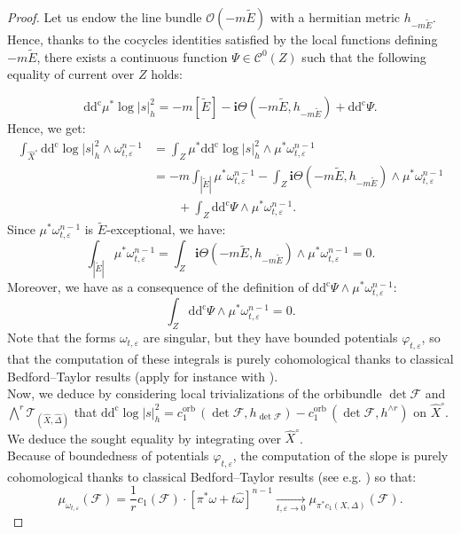 \documentclass[12pt,a4paper]{amsart}
\newcommand{\orb}{\mathrm{orb}\,}
\newcommand{\ddc}{\mathrm{dd^c}}
\theoremstyle{plain}
\theoremstyle{definition}
\begin{document}
\begin{proof}
	 Let us endow the line bundle $\mathcal{O}(-m \widetilde{E})$ with a hermitian metric $h_{-m \widetilde{E}}$. Hence, thanks to the cocycles identities satisfied by the local functions defining $-m \widetilde{E}$, there exists a continuous function $\Psi \in \mathcal{C}^0(Z)$ such that the following equality of current over $Z$ holds:
	 
	 $$
	 \ddc \mu^* \log |s|^2_h = -m \left[ \widetilde{E} \right] - \textbf{i}\Theta(-m \widetilde{E}, h_{-m\widetilde{E}}) + \ddc \Psi.
	 $$
    Hence, we get:
    \begin{equation}
    \begin{split}    
    \int_{\widehat{X}^\circ} \ddc \log |s|_h^2 \wedge \omega_{t, \varepsilon}^{n-1} 
    & = \int_{Z} \mu^*\ddc \log |s|_h^2 \wedge \mu^*\omega_{t, \varepsilon}^{n-1} \\
    & = -m \int_{|\widetilde{E}|} \mu^*\omega_{t, \varepsilon}^{n-1} - \int_{Z} \textbf{i}\Theta(-m \widetilde{E}, h_{-m\widetilde{E}}) \wedge \mu^*\omega_{t, \varepsilon}^{n-1} \\
    & \qquad + \int_{Z } \ddc \Psi \wedge \mu^*\omega_{t, \varepsilon}^{n-1}.
    \end{split}
    \end{equation}
    Since $\mu^*\omega_{t, \varepsilon}^{n-1}$ is $\widetilde{E}$-exceptional, we have:
    $$
    \int_{|\widetilde{E}|} \mu^*\omega_{t, \varepsilon}^{n-1} = \int_{Z} \textbf{i}\Theta(-m \widetilde{E}, h_{-m\widetilde{E}}) \wedge \mu^*\omega_{t, \varepsilon}^{n-1} = 0.
    $$
    Moreover, we have as a consequence of the definition of $\ddc \Psi \wedge \mu^*\omega_{t, \varepsilon}^{n-1}$:
    $$
    \int_{Z } \ddc \Psi \wedge \mu^*\omega_{t, \varepsilon}^{n-1} = 0.
    $$
    Note that the forms $\omega_{t, \varepsilon}$ are singular, but they have bounded potentials $\varphi_{t, \varepsilon}$, so that the computation of these integrals is purely cohomological thanks to classical Bedford--Taylor results (apply for instance \cite[Thm.~2.1]{Dar19} with \cite[Thm.~3.18]{GZ17}).\\
    
    Now, we deduce by considering local trivializations of the orbibundle $\det \mathcal{F}$ and $\bigwedge^r \mathcal{T}_{(\widehat{X}, \widehat{\Delta})}$ that $\ddc \log |s|^2_h = c_1^\orb(\det \mathcal{F}, h_{\det \mathcal{F}}) - c_1^\orb(\det \mathcal{F}, h^{\wedge r})$ on $\widehat{X}^\circ$. We deduce the sought equality by integrating over $\widehat{X}^\circ$.\\
    
    Because of boundedness of potentials $\varphi_{t, \varepsilon}$, the computation of the slope is purely cohomological thanks to classical Bedford--Taylor results (see e.g. \cite[Lemma.~2.2]{Dar19}) so that:
    $$
    \mu_{\omega_{t, \varepsilon}}(\mathcal{F}) = \frac{1}{r} c_1(\mathcal{F}) \cdot \left[ \pi^*\omega + t\widehat{\omega} \right]^{n-1} \underset{t, \varepsilon \longrightarrow 0}{\longrightarrow} \mu_{\pi^* c_1(X, \Delta)}(\mathcal{F}).
    $$
\end{proof}
\end{document}
